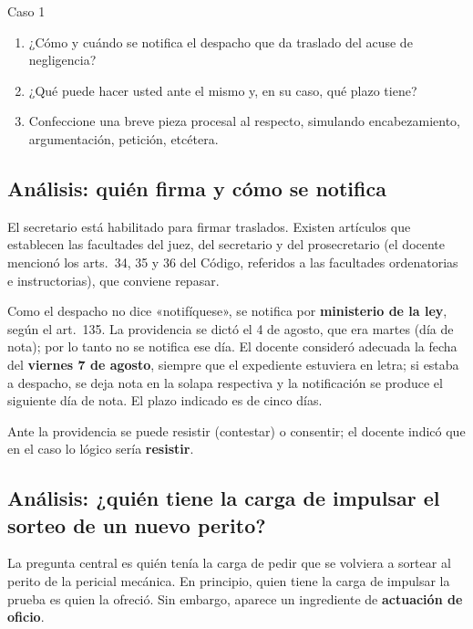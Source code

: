 \documentclass[12pt,oneside]{book}
\begin{document}
\begin{exercise}{Caso 1}
\begin{enumerate}
    \item ¿Cómo y cuándo se notifica el despacho que da traslado del acuse de negligencia?
    \item ¿Qué puede hacer usted ante el mismo y, en su caso, qué plazo tiene?
    \item Confeccione una breve pieza procesal al respecto, simulando encabezamiento, argumentación, petición, etcétera.
\end{enumerate}
\end{exercise}

\subsection{Análisis: quién firma y cómo se notifica}

El secretario está habilitado para firmar traslados. Existen artículos que establecen las facultades del juez, del secretario y del prosecretario (el docente mencionó los arts.~34, 35 y 36 del Código, referidos a las facultades ordenatorias e instructorias), que conviene repasar.

Como el despacho no dice «notifíquese», se notifica por \textbf{ministerio de la ley}, según el art.~135. La providencia se dictó el 4 de agosto, que era martes (día de nota); por lo tanto no se notifica ese día. El docente consideró adecuada la fecha del \textbf{viernes 7 de agosto}, siempre que el expediente estuviera en letra; si estaba a despacho, se deja nota en la solapa respectiva y la notificación se produce el siguiente día de nota. El plazo indicado es de cinco días.

Ante la providencia se puede resistir (contestar) o consentir; el docente indicó que en el caso lo lógico sería \textbf{resistir}.

\subsection{Análisis: ¿quién tiene la carga de impulsar el sorteo de un nuevo perito?}

La pregunta central es quién tenía la carga de pedir que se volviera a sortear al perito de la pericial mecánica. En principio, quien tiene la carga de impulsar la prueba es quien la ofreció. Sin embargo, aparece un ingrediente de \textbf{actuación de oficio}.
\end{document}
